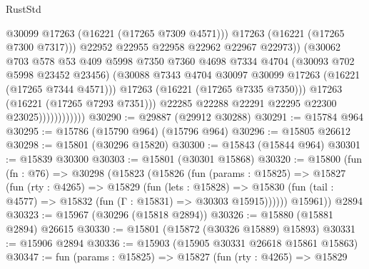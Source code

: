 \begin{lexlean}{RustStd}
\begin{coremodule}
                                      @30099
                                      @17263
                                      (@16221 (@17265 @7309 @4571)))
                                    @17263
                                    (@16221 (@17265 @7300 @7317)))
                                  @22952
                                  @22955
                                  @22958
                                  @22962
                                  @22967
                                  @22973))
                              (@30062
                                @703
                                @578
                                @53
                                @409
                                @5998
                                @7350
                                @7360
                                @4698
                                @7334
                                @4704
                                (@30093 @702 @5998 @23452 @23456)
                                (@30088
                                  @7343
                                  @4704
                                  @30097
                                  @30099
                                  @17263
                                  (@16221 (@17265 @7344 @4571)))
                                @17263
                                (@16221 (@17265 @7335 @7350)))
                              @17263
                              (@16221 (@17265 @7293 @7351)))
                            @22285
                            @22288
                            @22291
                            @22295
                            @22300
                            @23025))))))))))))
@30290 := @29887 (@29912 @30288)
@30291 := @15784 @964
@30295 := @15786 (@15790 @964) (@15796 @964)
@30296 := @15805 @26612
@30298 := @15801 (@30296 @15820)
@30300 := @15843 (@15844 @964)
@30301 := @15839 @30300
@30303 := @15801 (@30301 @15868)
@30320 := @15800
    (fun (fn : @76) =>
    @30298
      (@15823
        (@15826
          (fun (params : @15825) =>
          @15827
            (fun (rty : @4265) =>
            @15829
              (fun (lets : @15828) =>
              @15830 (fun (tail : @4577) => @15832 (fun (Γ : @15831) => @30303 @15915))))))
        @15961))
    @2894
@30323 := @15967 (@30296 (@15818 @2894))
@30326 := @15880 (@15881 @2894) @26615
@30330 := @15801 (@15872 (@30326 @15889) @15893)
@30331 := @15906 @2894
@30336 := @15903 (@15905 @30331 @26618 @15861 @15863)
@30347 := fun (params : @15825) =>
  @15827
    (fun (rty : @4265) =>
    @15829

\end{coremodule}
\end{lexlean}
